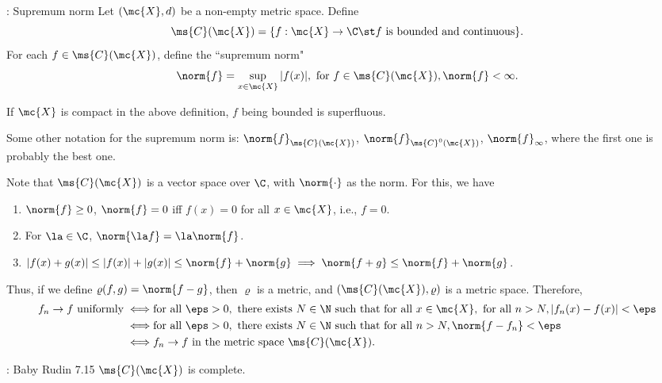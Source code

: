 \begin{ndef}{: Supremum norm}
	Let \((\mc{X},d)\) be a non-empty metric space. Define 
	\begin{equation*}
		\ms{C}(\mc{X})=\{f:\mc{X}\to\C\st f~\text{is bounded and continuous}\}.
	\end{equation*}
	For each \(f\in\ms{C}(\mc{X})\), define the ``supremum norm" 
	\begin{equation*}
		\norm{f}=\sup_{x\in\mc{X}}|f(x)|,~\text{for}~f\in\ms{C}(\mc{X}),\norm{f}<\infty.
	\end{equation*}
\end{ndef}
\begin{note}
	If \(\mc{X}\) is compact in the above definition, \(f\) being bounded is superfluous.
\end{note}
\begin{notation}
	Some other notation for the supremum norm is: \(\norm{f}_{\ms{C}(\mc{X})}\), \(\norm{f}_{\ms{C}^0(\mc{X})}\), \(\norm{f}_{\infty}\), where the first one is probably the best one.
\end{notation}
Note that \(\ms{C}(\mc{X})\) is a vector space over \(\C\), with \(\norm{\cdot}\) as the norm. For this, we have
\begin{enumerate}
	\item \(\norm{f}\geq 0\), \(\norm{f}=0\) iff \(f(x)=0\) for all \(x\in\mc{X}\), i.e., \(f=0\).
	
	\item For \(\la\in\C\), \(\norm{\la f}=\la\norm{f}\).
	
	\item \(|f(x)+g(x)|\leq |f(x)|+|g(x)|\leq \norm{f}+\norm{g}\implies \norm{f+g}\leq \norm{f}+\norm{g}\).
\end{enumerate}
Thus, if we define \(\varrho(f,g)=\norm{f-g}\), then \(\varrho\) is a metric, and \((\ms{C}(\mc{X}),\varrho)\) is a metric space. Therefore, 
\begin{align*}
	f_n\to f~\text{uniformly}\iff&\text{for all}~\eps>0,~\text{there exists}~N\in\N~\text{such that for all}~x\in\mc{X},~\text{for all}~n>N,|f_n(x)-f(x)|<\eps\\
	\iff&\text{for all}~\eps>0,~\text{there exists}~N\in\N~\text{such that for all}~n>N,\norm{f-f_n}<\eps\\
	\iff&f_n\to f~\text{in the metric space}~\ms{C}(\mc{X}).
\end{align*}
\begin{ntheorem}{: Baby Rudin 7.15}
	\(\ms{C}(\mc{X})\) is complete.
\end{ntheorem}
